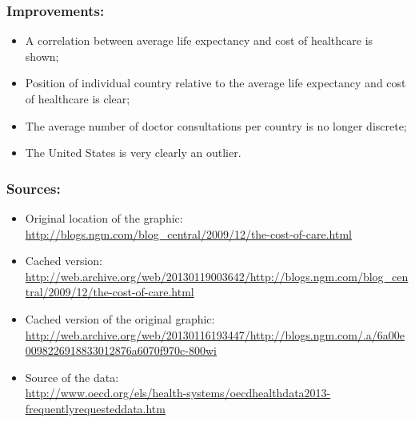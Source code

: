 \documentclass{beamer}
\begin{document}
{
    \begin{frame}[plain] \end{frame}
}

\begin{frame}
    \frametitle{Improvements:}
    \begin{itemize}
        \item A correlation between average life expectancy and cost of healthcare is shown;
        \item Position of individual country relative to the average life expectancy and cost of healthcare is clear;
        \item The average number of doctor consultations per country is no longer discrete;
        \item The United States is very clearly an outlier.
    \end{itemize}
\end{frame}


\begin{frame}
    \frametitle{Sources:}
    \begin{itemize}
        \item Original location of the graphic:\\{\tiny\url{http://blogs.ngm.com/blog_central/2009/12/the-cost-of-care.html}}
        \item Cached version:\\{\tiny\url{http://web.archive.org/web/20130119003642/http://blogs.ngm.com/blog_central/2009/12/the-cost-of-care.html}}
        \item Cached version of the original graphic:\\{\tiny\url{http://web.archive.org/web/20130116193447/http://blogs.ngm.com/.a/6a00e0098226918833012876a6070f970c-800wi}}
        \item Source of the data:\\{\tiny\url{http://www.oecd.org/els/health-systems/oecdhealthdata2013-frequentlyrequesteddata.htm}}
    \end{itemize}
\end{frame}
\end{document}
